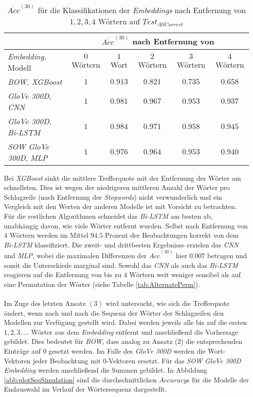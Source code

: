 \documentclass[a4paper,11pt]{article}
\begin{document}
\begin{table}[ht]
\centering
\begin{tabular}{|l||c|c|c|c|c|}
  \hline
  &  \multicolumn{5}{|c|}{$\overline{Acc}^{(30)}$ nach Entfernung von} \\
  \hline
  \textit{Embedding}, Modell & $0$ Wörtern & $1$ Wort & $2$ Wörtern & $3$ Wörtern & $4$ Wörtern \\
  \hline
   \textit{BOW}, \textit{XGBoost} & $1$ & $0.913$ &  $0.821$ & $0.735$ & $0.658$ \\
   \textit{GloVe 300D}, \textit{CNN} & $1$  & $0.981$ & $0.967$ & $0.953$ & $0.937$ \\
    \textit{GloVe 300D}, \textit{Bi-LSTM} & $1$ & $0.984$ & $0.971$ & $0.958$ & $0.945$ \\
     \textit{SOW GloVe 300D}, \textit{MLP} & $1$  & $0.976$ & $ 0.964$ & $0.953$ & $0.940$\\
     \hline
  
\end{tabular}
\caption{$\overline{Acc}^{(30)}$ für die Klassifikationen der \textit{Embeddings} nach Entfernung von $1,2,3,4$ Wörtern auf $Test_{AllCorrect}$}
\label{tab:AlternateRem}
\end{table}

Bei \textit{XGBoost} sinkt die mittlere Trefferquote mit der Entfernung der Wörter am schnellsten. Dies ist wegen der niedrigeren mittleren Anzahl der Wörter pro Schlagzeile (nach Entfernung der \textit{Stopwords}) nicht verwunderlich und ein Vergleich mit den Werten der anderen Modelle ist mit Vorsicht zu betrachten. Für die restlichen Algorithmen schneidet das \textit{Bi-LSTM} am besten ab, unabhängig davon, wie viele Wörter entfernt wurden. Selbst nach Entfernung von $4$ Wörtern werden im Mittel $94.5$ Prozent der Beobachtungen korrekt von dem \textit{Bi-LSTM} klassifiziert. Die zweit- und drittbesten Ergebnisse erzielen das \textit{CNN} und \textit{MLP}, wobei die maximalen Differenzen der $\overline{Acc}^{(30)}$ hier $0.007$ betragen und somit die Unterschiede marginal sind. Sowohl das \textit{CNN} als auch das \textit{Bi-LSTM} reagieren auf die Entfernung von bis zu $4$ Wörtern weit weniger sensibel als auf eine Permutation der Wörter (siehe Tabelle \ref{tab:AlternatePerm}).\\
\\
Im Zuge des letzten Ansatz $(3)$ wird untersucht, wie sich die Trefferquote ändert, wenn nach und nach die Sequenz der Wörter der Schlagzeilen den Modellen zur Verfügung gestellt wird. Dabei werden jeweils alle bis auf die ersten $1, 2, 3, ...$ Wörter aus dem \textit{Embedding} entfernt und anschließend die Vorhersage gebildet. Dies bedeutet für \textit{BOW}, dass analog zu Ansatz (2) die entsprechenden Einträge auf $0$ gesetzt werden. Im Falle des \textit{GloVe 300D} werden die Wort-Vektoren jeder Beobachtung mit $0$-Vektoren ersetzt. Für das \textit{SOW GloVe 300D} \textit{Embedding} werden anschließend die Summen gebildet. In Abbildung \ref{abb:plotSeqSimulation} sind die durchschnittlichen $Accuracy$s für die Modelle der Endauswahl im Verlauf der Wörtersequenz dargestellt.
\end{document}
